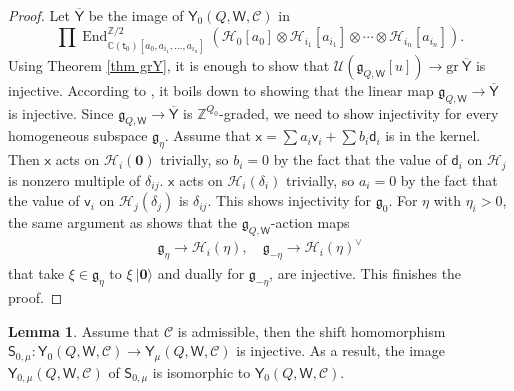\documentclass[10pt]{amsart}
\theoremstyle{definition}
\newtheorem{Lemma}[Theorem]{Lemma}
\numberwithin{equation}{section}
\newcommand{\bC}{\mathbb{C}}
\newcommand{\bZ}{\mathbb{Z}}
\newcommand{\cH}{\mathcal{H}}
\newcommand{\cU}{\mathcal{U}}
\newcommand{\sS}{\mathsf{S}}
\newcommand{\sW}{\mathsf{W}}
\newcommand{\End}{\operatorname{End}}
\begin{document}
\begin{proof}
Let $\overline{\mathsf Y}$ be the image of $\mathsf Y_0(Q,\sW,\mathcal C)$ in 
$$\prod\End^{\bZ/2}_{\bC(\mathsf t_0)[a_{0},a_{i_1},\ldots,a_{i_n}]}\left(\cH_0[a_0]\otimes\cH_{i_1}[a_{i_1}]\otimes\cdots\otimes \cH_{i_n}[a_{i_n}]\right).$$ 
Using Theorem \ref{thm grY}, it is enough to show that $\cU(\mathfrak{g}_{Q,\sW}[u])\to \mathrm{gr}\:\overline{\mathsf Y}$ is injective. According to \cite[\S 5.5.3]{MO}, it boils down to showing that the linear map $\mathfrak{g}_{Q,\sW}\to \overline{\mathsf Y}$ is injective. Since $\mathfrak{g}_{Q,\sW}\to \overline{\mathsf Y}$ is $\bZ^{Q_0}$-graded, we need to show injectivity for every homogeneous subspace $\mathfrak{g}_\eta$. Assume that $\mathsf x=\sum a_i\mathsf v_i+\sum b_i\mathsf d_i$ is in the kernel. Then $\mathsf x$ acts on $\cH_i(\mathbf 0)$ trivially, so $b_i=0$ by the fact that the value of $\mathsf d_i$ on $\cH_j$ is nonzero multiple of $\delta_{ij}$. $\mathsf x$ acts on $\cH_i(\delta_i)$ trivially, so $a_i=0$ by the fact that the value of $\mathsf v_i$ on $\cH_j(\delta_j)$ is $\delta_{ij}$. This shows injectivity for $\mathfrak{g}_0$. For $\eta$ with $\eta_i>0$, the same argument as \cite[Prop.~5.3.4]{MO} shows that the $\mathfrak{g}_{Q,\sW}$-action maps
\begin{align*}
    \mathfrak{g}_\eta\to \cH_i(\eta),\quad \mathfrak{g}_{-\eta}\to \cH_i(\eta)^{\vee}
\end{align*}
that take $\xi\in \mathfrak{g}_\eta$ to $\xi\:|\mathbf 0\rangle$ and dually for $\mathfrak{g}_{-\eta}$, are injective. This finishes the proof.
\end{proof}

\begin{Lemma}\label{lem shift map inj}
Assume that $\mathcal C$ is admissible, then the shift homomorphism $\sS_{0,\mu}\colon \mathsf Y_0(Q,\sW,\mathcal C)\to \mathsf Y_\mu(Q,\sW,\mathcal C)$ is injective. As a result, the image $\mathsf Y_{0,\mu}(Q,\sW,\mathcal C)$ of $\sS_{0,\mu}$ is isomorphic to $\mathsf Y_{0}(Q,\sW,\mathcal C)$.
\end{Lemma}
\end{document}
